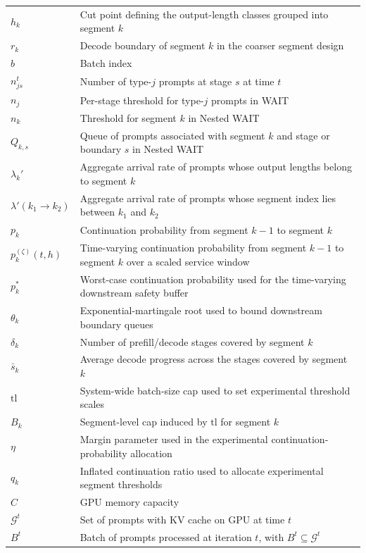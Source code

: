 \begin{center}
\begin{longtable}{>{\raggedright\arraybackslash}p{}p{}}
$h_k$ & Cut point defining the output-length classes grouped into segment $k$ \\
$r_k$ & Decode boundary of segment $k$ in the coarser segment design \\
$b$ & Batch index \\
$n_{js}^t$ & Number of type-$j$ prompts at stage $s$ at time $t$ \\
$n_j$ & Per-stage threshold for type-$j$ prompts in WAIT \\
$n_k$ & Threshold for segment $k$ in Nested WAIT \\
$Q_{k,s}$ & Queue of prompts associated with segment $k$ and stage or boundary $s$ in Nested WAIT \\
$\lambda_k'$ & Aggregate arrival rate of prompts whose output lengths belong to segment $k$ \\
$\lambda'(k_1\to k_2)$ & Aggregate arrival rate of prompts whose segment index lies between $k_1$ and $k_2$ \\
$p_k$ & Continuation probability from segment $k-1$ to segment $k$ \\
$p_k^{(\zeta)}(t,h)$ & Time-varying continuation probability from segment $k-1$ to segment $k$ over a scaled service window \\
$p_k^*$ & Worst-case continuation probability used for the time-varying downstream safety buffer \\
$\theta_k$ & Exponential-martingale root used to bound downstream boundary queues \\
$\delta_k$ & Number of prefill/decode stages covered by segment $k$ \\
$\bar s_k$ & Average decode progress across the stages covered by segment $k$ \\
$\mathrm{tl}$ & System-wide batch-size cap used to set experimental threshold scales \\
$B_k$ & Segment-level cap induced by $\mathrm{tl}$ for segment $k$ \\
$\eta$ & Margin parameter used in the experimental continuation-probability allocation \\
$q_k$ & Inflated continuation ratio used to allocate experimental segment thresholds \\
\midrule
$C$ & GPU memory capacity \\
$\mathcal{G}^t$ & Set of prompts with KV cache on GPU at time $t$ \\
$B^t$ & Batch of prompts processed at iteration $t$, with $B^t \subseteq \mathcal{G}^t$ \\

\end{longtable}
\end{center}
